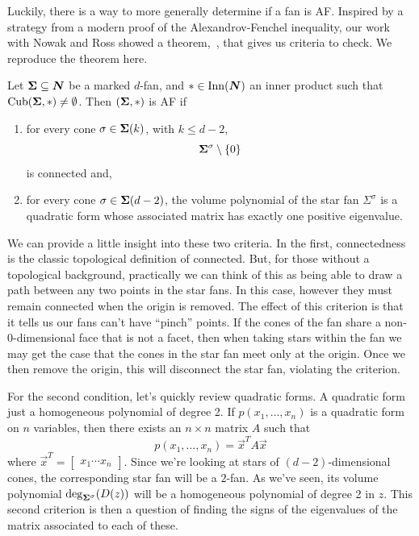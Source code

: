 \documentclass[12pt,oneside]{../../sfsuthesis}
\begin{document}
Luckily, there is a way to more generally determine if a fan is AF\@.
Inspired by a strategy from a modern proof of the Alexandrov-Fenchel inequality, our work with Nowak and Ross showed a theorem,~\cite[Theorem~5.1]{nowakMixedVolumesNormal2023}, that gives us criteria to check.
We reproduce the theorem here.
\begin{theorem}\th\label{thm:suffAF}
    Let \( {\bm{\Sigma}} \subseteq \bm{N} \) be a marked \( d \)-fan, and \( \ast \in \mathrm{Inn}(\bm{N}) \) an inner product such that \( \operatorname{Cub}({\bm{\Sigma}}, \ast) \neq \emptyset \).
    Then \( ({\bm{\Sigma}}, \ast) \) is AF if
    \begin{enumerate}[label=\roman*.]
        \item for every cone \( \sigma \in {\bm{\Sigma}}(k) \), with \( k \leq d - 2 \),
              \[
                  {\bm{\Sigma}}^\sigma \setminus \{ 0 \}
              \]
              is connected and,
        \item for every cone \( \sigma \in {\bm{\Sigma}}(d-2) \), the volume polynomial of the star fan \( \Sigma^\sigma \) is a quadratic form whose associated matrix has exactly one positive eigenvalue.
    \end{enumerate}
\end{theorem}
We can provide a little insight into these two criteria.
In the first, connectedness is the classic topological definition of connected.
But, for those without a topological background, practically we can think of this as being able to draw a path between any two points in the star fans.
In this case, however they must remain connected when  the origin is removed.
The effect of this criterion is that it tells us our fans can't have ``pinch'' points.
If the cones of the fan share a non-0-dimensional face that is not a facet, then when taking stars within the fan we may get the case that the cones in the star fan meet only at the origin.
Once we then remove the origin, this will disconnect the star fan, violating the criterion.

For the second condition, let's quickly review quadratic forms.
A quadratic form just a homogeneous polynomial of degree 2.
If \( p(x_1, \dots, x_n) \) is a quadratic form on \( n \) variables, then there exists an \( n \times n \) matrix \( A \) such that
\[
    p(x_1, \dots, x_n) = \vec{x}^T A \vec{x}
\]
where \( \vec{x}^T = \begin{bmatrix}
    x_1 \cdots x_n
\end{bmatrix} \).
Since we're looking at stars of \( (d - 2) \)-dimensional cones, the corresponding star fan will be a \( 2 \)-fan.
As we've seen, its volume polynomial \( \deg_{{\bm{\Sigma}}^\sigma}(D(z)) \) will be a homogeneous polynomial of degree 2 in \( z \).
This second criterion is then a question of finding the signs of the eigenvalues of the matrix associated to each of these.
\end{document}
